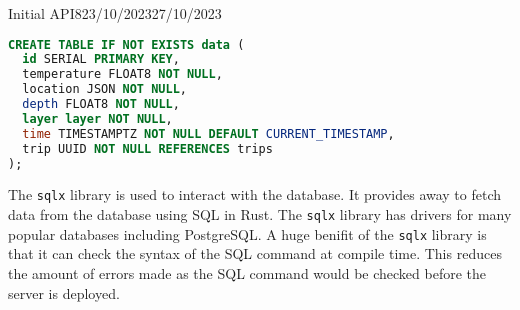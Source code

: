 \documentclass[12pt]{article}
\begin{document}
\begin{logbook-entry}{Initial API}{8}{23/10/2023}{27/10/2023}
\begin{lstlisting}[language=sql,caption={Database Schema of the Database}]
CREATE TABLE IF NOT EXISTS data (
  id SERIAL PRIMARY KEY,
  temperature FLOAT8 NOT NULL,
  location JSON NOT NULL,
  depth FLOAT8 NOT NULL,
  layer layer NOT NULL,
  time TIMESTAMPTZ NOT NULL DEFAULT CURRENT_TIMESTAMP,
  trip UUID NOT NULL REFERENCES trips
);
\end{lstlisting}

The \lstinline{sqlx} library is used to interact with the database.
It provides away to fetch data from the database using SQL in Rust.
The \lstinline{sqlx} library has drivers for many popular databases including PostgreSQL.
A huge benifit of the \lstinline{sqlx} library is that it can check the syntax of the SQL command at compile time.
This reduces the amount of errors made as the SQL command would be checked before the server is deployed.
\end{logbook-entry}
\end{document}
